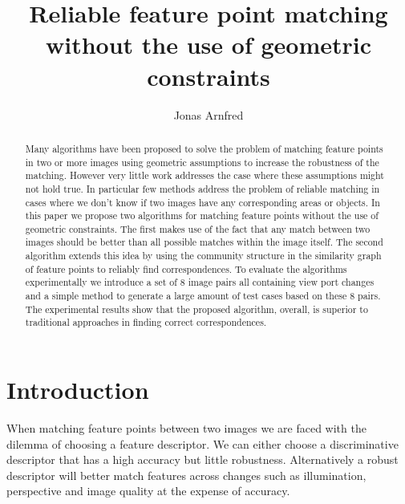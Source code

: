 \documentclass{article}
\begin{document}
\title{Reliable feature point matching without the use of geometric 
constraints}
\author{Jonas Arnfred}

\maketitle

\begin{abstract}
Many algorithms have been proposed to solve the problem of matching 
feature points in two or more images using geometric assumptions to 
increase the robustness of the matching. However very little work 
addresses the case where these assumptions might not hold true. In 
particular few methods address the problem of reliable matching in cases 
where we don't know if two images have any corresponding areas or 
objects. In this paper we propose two algorithms for matching feature 
points without the use of geometric constraints. The first makes use of 
the fact that any match between two images should be better than all 
possible matches within the image itself. The second algorithm extends 
this idea by using the community structure in the similarity graph of 
feature points to reliably find correspondences. To evaluate the 
algorithms experimentally we introduce a set of 8 image pairs all 
containing view port changes and a simple method to generate a large 
amount of test cases based on these 8 pairs. The experimental results 
show that the proposed algorithm, overall, is superior to traditional 
approaches in finding correct correspondences.
\end{abstract}

\section{Introduction}

When matching feature points between two images we are faced with the 
dilemma of choosing a feature descriptor. We can either choose a 
discriminative descriptor that has a high accuracy but little 
robustness. Alternatively a robust descriptor will better match features 
across changes such as illumination, perspective and image quality at 
the expense of accuracy.
\end{document}
